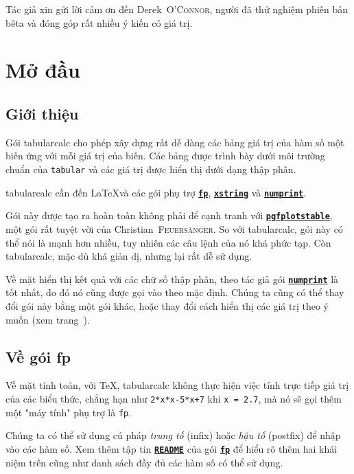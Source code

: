 \documentclass[a4paper,10pt]{article}
\newcommand\tbcalc{\textsf{tabularcalc}\xspace}
\begin{document}
\tableofcontents

\bigskip
Tác giả xin gửi lời cảm ơn đến Derek~\textsc{O'Connor}, người đã thử nghiệm phiên bản bêta và đóng góp rất nhiều ý kiến có giá trị.

\section{Mở đầu}
\subsection{Giới thiệu}
Gói \tbcalc cho phép xây dựng rất dễ dàng các bảng giá trị của hàm số một biến ứng với mỗi giá trị của biến. Các bảng được trình bày dưới môi trường chuẩn của \verb|tabular| và các giá trị được hiển thị dưới dạng thập phân.

\tbcalc cần đến \LaTeX và các gói phụ trợ \href{http://www.ctan.org/tex-archive/macros/latex/contrib/fp/}{\texttt{\textbf{fp}}}, \href{http://www.ctan.org/tex-archive/macros/latex/contrib/xstring/}{\texttt{\textbf{xstring}}} và \href{http://www.ctan.org/tex-archive/macros/latex/contrib/numprint/}{\texttt{\textbf{numprint}}}. 

Gói này được tạo ra hoàn toàn không phải để cạnh tranh với \href{http://www.ctan.org/tex-archive/graphics/pgf/contrib/pgfplots/}{\texttt{\textbf{pgfplotstable}}}, một gói rất tuyệt vời của Christian~\textsc{Feuers\"anger}. So với \tbcalc, gói này có thể nói là mạnh hơn nhiều, tuy nhiên các câu lệnh của nó khá phức tạp. Còn \tbcalc, mặc dù khá giản dị, nhưng lại rất dễ sử dụng.\medskip

Về mặt hiển thị kết quả với các chữ số thập phân, theo tác giả gói \href{http://www.ctan.org/tex-archive/macros/latex/contrib/numprint/}{\texttt{\textbf{numprint}}} là tốt nhất, do đó nó cũng được gọi vào theo mặc định. Chúng ta cũng có thể thay đổi gói này bằng một gói khác, hoặc thay đổi cách hiển thị các giá trị theo ý muốn (xem trang~\pageref{persoaffichage}).\medskip

\subsection{Về gói \ttfamily fp}
Về mặt tính toán, với \TeX{}, \tbcalc không thực hiện việc tính trực tiếp giá trị của các biểu thức, chẳng hạn như \verb|2*x*x-5*x+7| khi \hbox{\verb|x = 2.7|}, mà nó sẽ gọi thêm một "máy tính" phụ trợ là \verb=fp=.\smallskip

Chúng ta có thể sử dụng cú pháp \emph{trung tố} (infix) hoặc \emph{hậu tố} (postfix) để nhập vào các hàm số. Xem thêm tập tin \href{http://www.ctan.org/get/macros/latex/contrib/fp/README}{\texttt{\textbf{README}}} của gói \href{http://www.ctan.org/tex-archive/macros/latex/contrib/fp/}{\texttt{\textbf{fp}}} để hiểu rõ thêm hai khái niệm trên cũng như danh sách đầy đủ các hàm số có thể sử dụng.\medskip
\end{document}
